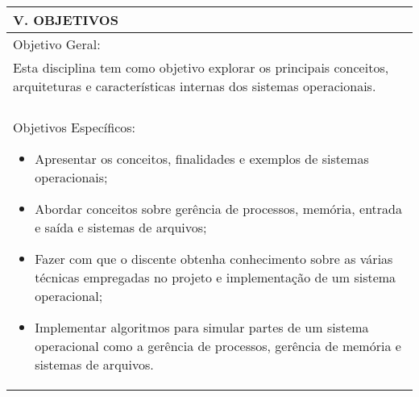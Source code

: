 \documentclass[12pt]{article}
\begin{document}
\begin{longtable}{|L{1.025\textwidth}|} \hline
%
{\bf V. OBJETIVOS } \\ \hline
Objetivo Geral: \\

Esta disciplina tem como objetivo explorar os principais conceitos, arquiteturas e características internas dos sistemas operacionais. \\
\\
Objetivos Específicos:
\begin{itemize}
\item Apresentar os conceitos, finalidades e exemplos de sistemas operacionais;
\item Abordar conceitos sobre gerência de processos, memória, entrada e saída e sistemas de arquivos;
\item Fazer com que o discente obtenha conhecimento sobre as várias técnicas empregadas no projeto e implementação de um sistema operacional;
\item Implementar algoritmos para simular partes de um sistema operacional como a gerência de processos, gerência de memória e sistemas de arquivos.
\end{itemize}
\\ \hline
\end{longtable}
\end{document}
